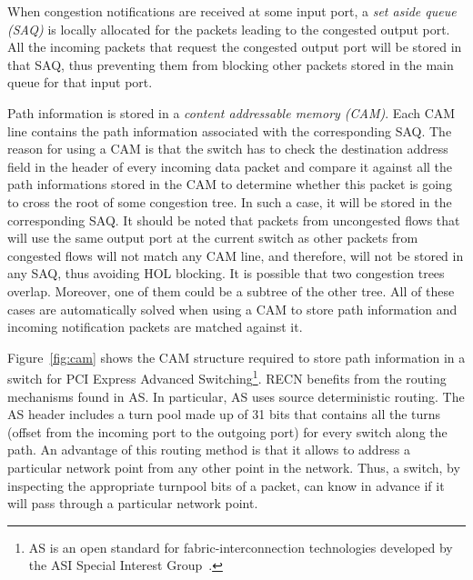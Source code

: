 \documentclass[12pt]{article}
\begin{document}
When congestion notifications are received at some input port, a \emph{set aside queue (SAQ)} is locally allocated for the packets leading to the congested output port. All the incoming packets that request the congested output port will be stored in that SAQ, thus preventing them from blocking other packets stored in the main queue for that input port.

Path information is stored in a \emph{content addressable memory (CAM)}. Each CAM line contains the path information associated with the corresponding SAQ. The reason for using a CAM is that the switch has to check the destination address field in the header of every incoming data packet and compare it against all the path informations stored in the CAM to determine whether this packet is going to cross the root of some congestion tree. In such a case, it will be stored in the corresponding SAQ. It should be noted that packets from uncongested flows that will use the same output port at the current switch as other packets from congested flows will not match any CAM line, and therefore, will not be stored in any SAQ, thus avoiding HOL blocking. It is possible that two congestion trees overlap. Moreover, one of them could be a subtree of the other tree. All of these cases are automatically solved when using a CAM to store path information and incoming notification packets are matched against it.

Figure~\ref{fig:cam} shows the CAM structure required to store path information in a switch for PCI Express Advanced Switching\footnote{AS is an open standard for fabric-interconnection technologies developed by the ASI Special Interest Group~\cite{AS}.}. RECN benefits from the routing mechanisms found in AS. In particular, AS uses source deterministic routing. The AS header includes a turn pool made up of 31 bits that contains all the turns (offset from the incoming port to the outgoing port) for every switch along the path. An advantage of this routing method is that it allows to address a particular network point from any other point in the network. Thus, a switch, by inspecting the appropriate turnpool bits of a packet, can know in advance if it will pass through a particular network point.
\end{document}
